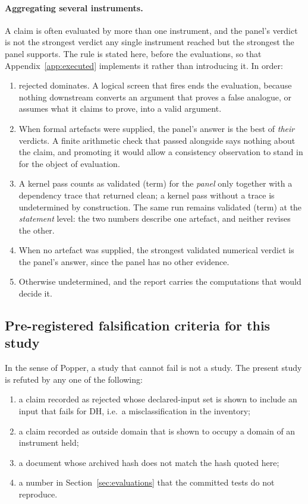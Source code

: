\documentclass[11pt,a4paper]{article}
\newcommand{\verdict}[1]{\textsf{#1}}
\begin{document}
\paragraph{Aggregating several instruments.}
\label{sec:aggregation}
A claim is often evaluated by more than one instrument, and the panel's verdict is not the
strongest verdict any single instrument reached but the strongest the panel supports. The rule is
stated here, before the evaluations, so that Appendix~\ref{app:executed} implements it rather than
introducing it. In order:
\begin{enumerate}
\item \verdict{rejected} dominates. A logical screen that fires ends the evaluation, because
  nothing downstream converts an argument that proves a false analogue, or assumes what it claims
  to prove, into a valid argument.
\item When formal artefacts were supplied, the panel's answer is the best of \emph{their} verdicts.
  A finite arithmetic check that passed alongside says nothing about the claim, and promoting it
  would allow a consistency observation to stand in for the object of evaluation.
\item A kernel pass counts as \verdict{validated (term)} for the \emph{panel} only together with a
  dependency trace that returned clean; a kernel pass without a trace is \verdict{undetermined} by
  construction. The same run remains \verdict{validated (term)} at the \emph{statement} level: the
  two numbers describe one artefact, and neither revises the other.
\item When no artefact was supplied, the strongest validated numerical verdict is the panel's
  answer, since the panel has no other evidence.
\item Otherwise \verdict{undetermined}, and the report carries the computations that would decide
  it.
\end{enumerate}

\subsection{Pre-registered falsification criteria for this study}

In the sense of Popper, a study that cannot fail is not a study. The present study is
refuted by any one of the following:
\begin{enumerate}
\item a claim recorded as \verdict{rejected} whose declared-input set is shown to include an
  input that fails for DH, i.e.\ a misclassification in the inventory;
\item a claim recorded as \verdict{outside domain} that is shown to occupy a domain of an
  instrument held;
\item a document whose archived hash does not match the hash quoted here;
\item a number in Section~\ref{sec:evaluations} that the committed tests do not reproduce.
\end{enumerate}
\end{document}
